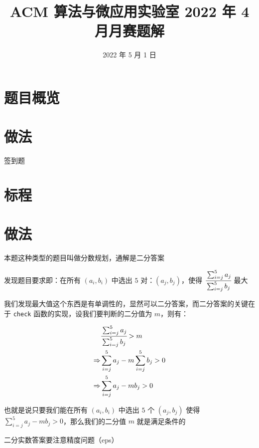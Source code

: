\documentclass[fontset=ubuntu]{ctsol}
\title{ACM 算法与微应用实验室 2022 年 4 月月赛题解}
\date{2022 年 5 月 1 日}
\begin{document}
\maketitle
{}

\section*{题目概览}

\solutiontab

\makesolution
\section*{做法}

签到题

\section*{标程}


\makesolution
\section*{做法}

本题这种类型的题目叫做分数规划，通解是二分答案

发现题目要求即：在所有 $(a_i,b_i)$ 中选出 $5$ 对：$(a_j,b_j)$，使得 $\cfrac{\sum_{i=j}^{5}a_j}{\sum_{i=j}^{5}b_j}$ 最大

我们发现最大值这个东西是有单调性的，显然可以二分答案，而二分答案的关键在于 \verb|check| 函数的实现，设我们要判断的二分值为 $m$，则有：

$$
    \begin{aligned}
                    & \cfrac{\sum_{i=j}^{5}a_j}{\sum_{i=j}^{5}b_j} > m \\
        \Rightarrow & \sum_{i=j}^{5}a_j - m\sum_{i=j}^{5}b_j > 0 \\
        \Rightarrow & \sum_{i=j}^{5}a_j-mb_j > 0
    \end{aligned}
$$

也就是说只要我们能在所有 $(a_i,b_i)$ 中选出 $5$ 个 $(a_j,b_j)$ 使得 $\sum_{i=j}^{5}a_j-mb_j > 0$，那么我们的二分值 $m$ 就是满足条件的

二分实数答案要注意精度问题（eps）
\end{document}
